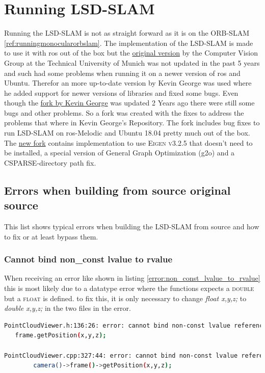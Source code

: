 \section{Running LSD-SLAM\authorA}
Running the LSD-SLAM is not as straight forward as it is on the ORB-SLAM \ref{ref:runningmonocularorbslam}. The implementation of the LSD-SLAM is made to use it with \gls{ros} out of the box but the \href{https://github.com/tum-vision/lsd_slam}{original version} \cite{githublsdslamtum} by the Computer Vision Group at the Technical University of Munich was not updated in the past 5 years and such had some problems when running it on a newer version of \gls{ros} and Ubuntu. Therefor an more up-to-date version by Kevin George was used where he added support for newer versions of libraries and fixed some bugs. Even though the \href{https://github.com/kevin-george/lsd_slam}{fork by Kevin George} \cite{kevingeorgelsdslam} was updated 2 Years ago there were still some bugs and other problems. So a fork was created with the fixes to address the problems that where in Kevin George's Repository. The fork includes bug fixes to run LSD-SLAM on \gls{ros}-Melodic and Ubuntu 18.04 pretty much out of the box.\newline
The \href{https://github.com/MrMinemeet/lsd_slam}{new fork} \cite{alexandervoglspergerlsdslam} contains implementation to use \textsc{Eigen v3.2.5} that doesn't need to be installed, a special version of General Graph Optimization (\gls{g2o}) and a \textsc{CSPARSE}-directory path fix.\newline

\subsection{Errors when building from source original source}
This list shows typical errors when building the LSD-SLAM from source and how to fix or at least bypass them.

\subsubsection{Cannot bind non\_const lvalue to rvalue}
When receiving an error like shown in listing \ref{error:non_const_lvalue_to_rvalue} this is most likely due to a datatype error where the functions expects a \textsc{double} but a \textsc{float} is defined.
to fix this, it is only necessary to change \textit{float x,y,z;} to \textit{double x,y,z;} in the two files in the error.\newline
\begin{lstlisting}[language=bash,label={error:non_const_lvalue_to_rvalue}]
PointCloudViewer.h:136:26: error: cannot bind non-const lvalue reference of type 'qreal& {aka double&}' to an rvalue of type 'qreal {aka double}'
   frame.getPosition(x,y,z);
   
PointCloudViewer.cpp:327:44: error: cannot bind non-const lvalue reference of type 'qreal& {aka double&}' to an rvalue of type 'qreal {aka double}'
        camera()->frame()->getPosition(x,y,z);
\end{lstlisting}

